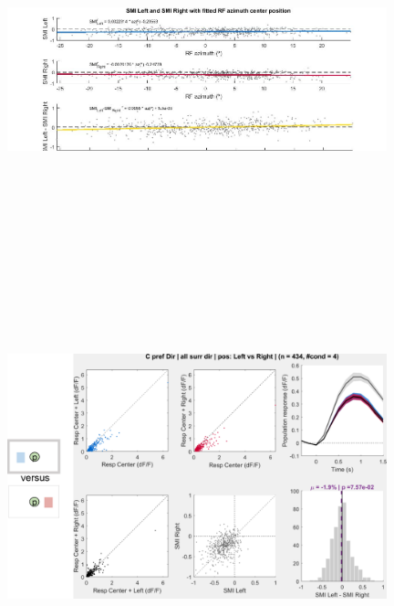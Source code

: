 %

\begin{figure}[H] \centering \includegraphics[width=11cm,height=11cm,keepaspectratio]{Figures/7.Results/population/sel/15_LeftversusRightwithAzimuth.jpg} 
\end{figure}

\begin{figure}[H] \centering \includegraphics[width=11cm,height=11cm,keepaspectratio]{Figures/7.Results/population/sel/diagrams/3.png} 
\end{figure}

